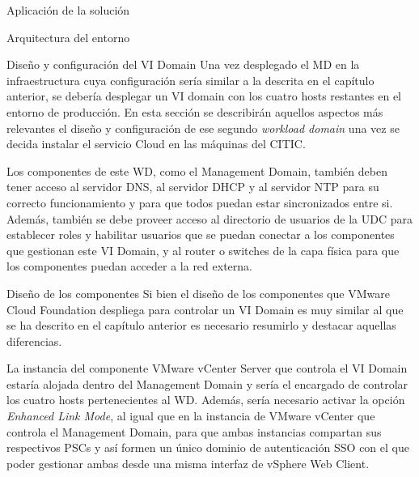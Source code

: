 \begin{chapter}{Aplicación de la solución}
\begin{section}{Arquitectura del entorno}
\begin{subsection}{Diseño y configuración del VI Domain}
    Una vez desplegado el MD en la infraestructura cuya configuración sería similar a la descrita en el capítulo anterior, se debería desplegar un VI domain con los cuatro hosts restantes en el entorno de producción. En esta sección se describirán aquellos aspectos más relevantes el diseño y configuración de ese segundo \textit{workload domain} una vez se decida instalar el servicio Cloud en las máquinas del CITIC.

    Los componentes de este WD, como el Management Domain, también deben tener acceso al servidor DNS, al servidor DHCP y al servidor NTP para su correcto funcionamiento y para que todos puedan estar sincronizados entre si. Además, también se debe proveer acceso al directorio de usuarios de la UDC para establecer roles y habilitar usuarios que se puedan conectar a los componentes que gestionan este VI Domain, y al router o switches de la capa física para que los componentes puedan acceder a la red externa.

    \begin{subsubsection}{Diseño de los componentes}
        Si bien el diseño de los componentes que VMware Cloud Foundation despliega para controlar un VI Domain es muy similar al que se ha descrito en el capítulo anterior es necesario resumirlo y destacar aquellas diferencias.

        La instancia del componente VMware vCenter Server que controla el VI Domain estaría alojada dentro del Management Domain y sería el encargado de controlar los cuatro hosts pertenecientes al WD. Además, sería necesario activar la opción \textit{Enhanced Link Mode}, al igual que en la instancia de VMware vCenter que controla el Management Domain, para que ambas instancias compartan sus respectivos PSCs y así formen un único dominio de autenticación SSO con el que poder gestionar ambas desde una misma interfaz de vSphere Web Client.


\end{subsubsection}
\end{subsection}
\end{section}
\end{chapter}
